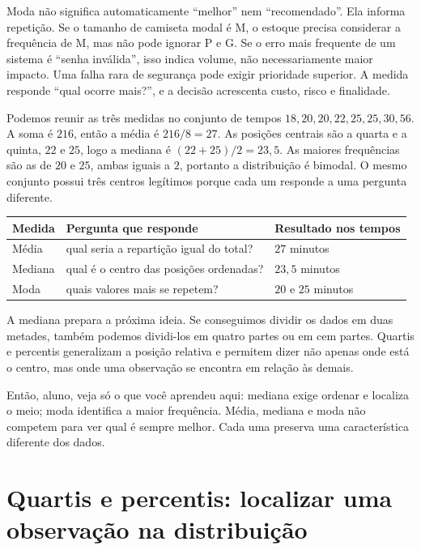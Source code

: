Moda não significa automaticamente ``melhor'' nem ``recomendado''. Ela informa repetição. Se o tamanho de camiseta modal é M, o estoque precisa considerar a frequência de M, mas não pode ignorar P e G. Se o erro mais frequente de um sistema é ``senha inválida'', isso indica volume, não necessariamente maior impacto. Uma falha rara de segurança pode exigir prioridade superior. A medida responde ``qual ocorre mais?'', e a decisão acrescenta custo, risco e finalidade.

Podemos reunir as três medidas no conjunto de tempos ${18,20,20,22,25,25,30,56}$. A soma é $216$, então a média é $216/8=27$. As posições centrais são a quarta e a quinta, $22$ e $25$, logo a mediana é $(22+25)/2=23{,}5$. As maiores frequências são as de $20$ e $25$, ambas iguais a $2$, portanto a distribuição é bimodal. O mesmo conjunto possui três centros legítimos porque cada um responde a uma pergunta diferente.

\begin{center}
\small
\begin{tabularx}{0.94\textwidth}{@{}p{2.6cm}YY@{}}
\toprule
\textbf{Medida} & \textbf{Pergunta que responde} & \textbf{Resultado nos tempos} \\
\midrule
Média & qual seria a repartição igual do total? & $27$ minutos \\
Mediana & qual é o centro das posições ordenadas? & $23{,}5$ minutos \\
Moda & quais valores mais se repetem? & $20$ e $25$ minutos \\
\bottomrule
\end{tabularx}
\end{center}

A mediana prepara a próxima ideia. Se conseguimos dividir os dados em duas metades, também podemos dividi-los em quatro partes ou em cem partes. Quartis e percentis generalizam a posição relativa e permitem dizer não apenas onde está o centro, mas onde uma observação se encontra em relação às demais.

\begin{SummaryBox}
Então, aluno, veja só o que você aprendeu aqui: mediana exige ordenar e localiza o meio; moda identifica a maior frequência. Média, mediana e moda não competem para ver qual é sempre melhor. Cada uma preserva uma característica diferente dos dados.
\end{SummaryBox}

\section{Quartis e percentis: localizar uma observação na distribuição}

